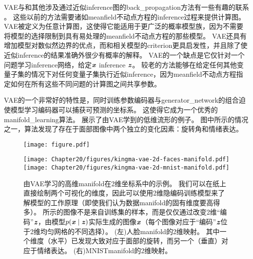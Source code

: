 \gls{VAE}与和其他涉及通过近似\gls{inference}图的\gls{back_propagation}方法有一些有趣的联系 \citep{Goodfellow-et-al-NIPS2013,Stoyanov2011,brakel13a}。
这些以前的方法需要诸如\gls{meanfield}不动点方程的\gls{inference}过程来提供计算图。
\gls{VAE}被定义为任意计算图，这使得它能适用于更广泛的概率模型族，因为不需要将模型的选择限制到具有易处理的\gls{meanfield}不动点方程的那些模型。
\gls{VAE}还具有增加模型对数似然边界的优点，而和相关模型的\gls{criterion}更具启发性，并且除了使近似\gls{inference}的结果准确外很少有概率的解释。
\gls{VAE}的一个缺点是它仅针对一个问题学习\gls{inference}网络，给定$\boldsymbol{\mathit{x}}$ \gls{inference} $\boldsymbol{\mathit{z}}$。
较老的方法能够在给定任何其他变量子集的情况下对任何变量子集执行近似\gls{inference}，因为\gls{meanfield}不动点方程指定如何在所有这些不同问题的计算图之间共享参数。


\gls{VAE}的一个非常好的特性是，同时训练参数编码器与\gls{generator_network}的组合迫使模型学习编码器可以捕获可预测的坐标系。
这使得它成为一个优秀的\gls{manifold_learning}算法。
展示了由\gls{VAE}学到的低维流形的例子。
图中所示的情况之一，算法发现了存在于面部图像中两个独立的变化因素：旋转角和情绪表达。


\begin{figure}[!htb]
\ifOpenSource
\centerline{\texttt{[image: figure.pdf]}}
\else
\centerline{
\texttt{[image: Chapter20/figures/kingma-vae-2d-faces-manifold.pdf]}
\texttt{[image: Chapter20/figures/kingma-vae-2d-mnist-manifold.pdf]}
}
\fi
\caption{由\gls{VAE}学习的高维\gls{manifold}在2维坐标系中的示例\citep{Kingma+Welling-ICLR2014}。
我们可以在纸上直接绘制两个可视化的维度，因此可以使用2维隐编码训练模型来了解模型的工作原理（即使我们认为数据\gls{manifold}的固有维度要高得多）。
所示的图像不是来自训练集的样本，而是仅仅通过改变2维``编码''$\boldsymbol{\mathit{z}}$，由模型$p(\boldsymbol{\mathit{x}} \mid \boldsymbol{\mathit{z}})$实际生成的图像$\boldsymbol{\mathit{x}}$（每个图像对应于``编码''$\boldsymbol{\mathit{z}}$位于2维均匀网格的不同选择）。
(左)人脸\gls{manifold}的2维映射。 其中一个维度（水平）已发现大致对应于面部的旋转，而另一个（垂直）对应于情绪表达。
(右)MNIST\gls{manifold}的2维映射。
}
\label{fig:chap20_kingma-vae-2d-faces-manifold}
\end{figure}

\subsection{}
\label{sec:generative_adversarial_networks}

